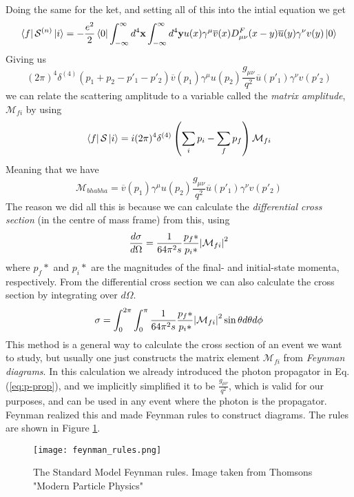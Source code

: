 \documentclass[12pt, a4paper]{book}
\begin{document}
Doing the same for the ket, and setting all of this into the intial equation we get
$$
\bra{f}\mathcal{S}^{(n)}\ket{i} = -\frac{e^2}{2}\bra{0}\int_{-\infty}^{\infty}d^4\mathbf{x} \int_{-\infty}^{\infty}d^4\mathbf{y} u(x)\gamma^\mu\overline{v}(x)D_{\mu\nu}^F(x-y)\overline{u}(y)\gamma^\nu v(y)\ket{0}
$$
Giving us
$$
(2\pi)^4\delta^{(4)}(p_1+p_2-p'_1-p'_2)\overline{v}(p_1)\gamma^\mu u(p_2) \frac{g_{\mu\nu}}{q^2}\overline{u}(p'_1)\gamma^\nu v(p'_2)
$$
we can relate the scattering amplitude to a variable called the \textit{matrix amplitude}, $\mathcal{M}_{fi}$ by using 
$$
\bra{f}\mathcal{S}\ket{i} = i(2\pi)^4\delta^{(4)}\left(\sum_i p_i -\sum_f p_f\right)\mathcal{M}_{fi}
$$
Meaning that we have
$$
\mathcal{M}_{bhabha} = \overline{v}(p_1)\gamma^\mu u(p_2) \frac{g_{\mu\nu}}{q^2}\overline{u}(p'_1)\gamma^\nu v(p'_2)
$$
The reason we did all this is because we can calculate the \textit{differential cross section} (in the centre of mass frame) from this, using
\begin{equation}\label{eq:diff_cross}
    \frac{d\sigma}{d\Omega} = \frac{1}{64\pi^2s}\frac{p_f*}{p_i*}\abs{\mathcal{M}_{fi}}^2
\end{equation}
where $p_f*$ and $p_i*$ are the magnitudes of the final- and initial-state momenta, respectively. From the differential cross section we can also calculate the cross section by integrating over $d\Omega$. 
\begin{equation}\label{eq:cross_sec}
    \sigma = \int_{0}^{2\pi}\int_{0}^{\pi}\frac{1}{64\pi^2s}\frac{p_f*}{p_i*}\abs{\mathcal{M}_{fi}}^2 \sin\theta d\theta d\phi
\end{equation}
This method is a general way to calculate the cross section of an event we want to study, but usually one just constructs the matrix element $\mathcal{M}_{fi}$ from \textit{Feynman diagrams}. In this calculation we 
already introduced the photon propagator in Eq. (\ref{eq:p-prop}), and we implicitly simplified it to be $\frac{g_{\mu\nu}}{q^2}$, which is valid for our purposes, and can be used in any event where the photon is the propagator. 
Feynman realized this and made Feynman rules to construct diagrams. The rules are shown in Figure \ref{fig:feynman_rules}. \\
\graphicspath{{../../figures/}}
\begin{figure}[!ht]
    \centering
    \texttt{[image: feynman\_rules.png]}
    \caption[Standard Model Feynman Rules]{The Standard Model Feynman rules. Image taken from Thomsons "Modern Particle Physics" \cite{THOMSON}}\label{fig:feynman_rules}
\end{figure}
\end{document}
